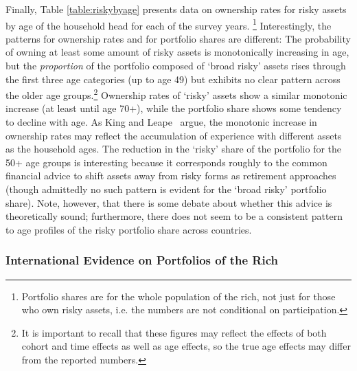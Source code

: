 \documentclass[12pt]{article}
\begin{document}
Finally, Table \ref{table:riskybyage} presents data on ownership rates for
risky assets by age of the household head for each of the survey years.%
\footnote{%
Portfolio shares are for the whole population of the rich, not just for
those who own risky assets, i.e. the numbers are not conditional on
participation.} Interestingly, the patterns for ownership rates and for
portfolio shares are different: The probability of owning at least some
amount of risky assets is monotonically increasing in age, but the \textit{%
proportion} of the portfolio composed of `broad risky' assets rises through
the first three age categories (up to age 49) but exhibits no clear pattern
across the older age groups.\footnote{%
It is important to recall that these figures may reflect the effects of both
cohort and time effects as well as age effects, so the true age effects may
differ from the reported numbers.} Ownership rates of `risky' assets show a
similar monotonic increase (at least until age 70+), while the portfolio
share shows some tendency to decline with age. As King and Leape~\cite
{king&leape:ageinfo} argue, the monotonic increase in ownership rates may
reflect the accumulation of experience with different assets as the
household ages. The reduction in the `risky' share of the portfolio for the
50+ age groups is interesting because it corresponds roughly to the common
financial advice to shift assets away from risky forms as retirement
approaches (though admittedly no such pattern is evident for the `broad
risky' portfolio share). Note, however, that there is some debate about
whether this advice is theoretically sound; furthermore,  there does not seem to be a consistent
pattern to age profiles of the risky portfolio share across countries.

\subsubsection{International Evidence on Portfolios of the Rich}
\end{document}
